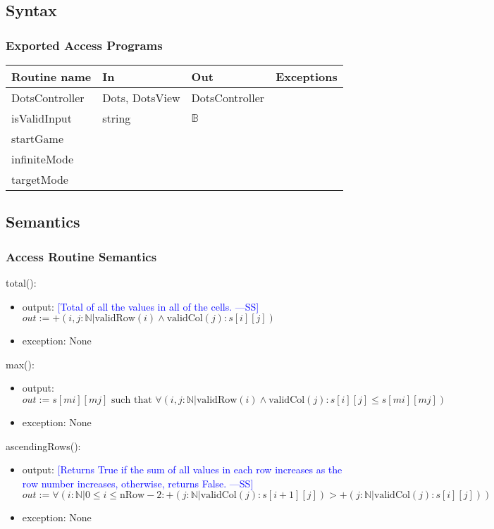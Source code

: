 \documentclass[12pt]{article}
\newcommand{\authornote}[3]{\textcolor{#1}{[#3 ---#2]}}
\newcommand{\authornote}[3]{}
\newcommand{\wss}[1]{\authornote{blue}{SS}{#1}}
\begin{document}
\subsection* {Syntax}

\subsubsection* {Exported Access Programs}

\begin{tabular}{| l | l | l | p{6cm} |}
\hline
\textbf{Routine name} & \textbf{In} & \textbf{Out} & \textbf{Exceptions}\\
\hline
DotsController & Dots, DotsView & DotsController & \\
\hline
isValidInput & string & $\mathbb{B}$ & ~\\
\hline
startGame & ~ & ~ & ~ \\
\hline
infiniteMode & ~ & ~ & ~ \\
\hline
targetMode & ~ & ~ & ~ \\
\hline
\end{tabular}

\subsection* {Semantics}

\subsubsection* {Access Routine Semantics}

\noindent total():
\begin{itemize}
\item output: \wss{Total of all the values in all of the cells.}$out := +(i, j: \mathbb{N}| \mbox{validRow}(i) \land
  \mbox{validCol}(j)  : s[i][j] )$
\item exception: None
\end{itemize}

\noindent max():
\begin{itemize}
\item output:   $out := s[mi][mj] \mbox{ such that } \forall (i, j: \mathbb{N}|
  \mbox{validRow}(i) \land \mbox{validCol}(j) : s[i][j] \leq s[mi][mj])$
\item exception: None
\end{itemize}

\noindent ascendingRows():
\begin{itemize}
\item output: \wss{Returns True if the sum of all values in each row increases
    as the row number increases, otherwise, returns False.}$out := \forall (i:
  \mathbb{N}| 0 \leq i \leq \text{nRow} - 2 : +(j: \mathbb{N} |
  \text{validCol}(j) : s[i+1][j]) > +(j: \mathbb{N} |
  \text{validCol}(j) : s[i][j]))$
\item exception: None
\end{itemize}
\end{document}
